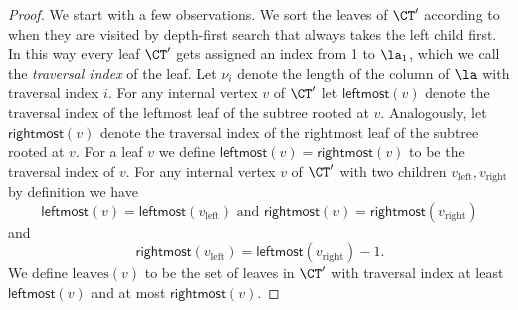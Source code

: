 \begin{proof}
We start with a few observations.
We sort the leaves of $\CT'$ according to when they are visited by depth-first search that always takes the left child first. In this way every leaf $\CT'$ gets assigned an index from 1 to $\la_1$, which we call the \emph{traversal index} of the leaf.
Let $\nu_i$ denote the length of the column of $\la$ with traversal index $i$.
For any internal vertex $v$ of $\CT'$ let $\textsf{leftmost}(v)$ denote the traversal index of the leftmost leaf of the subtree rooted at $v$.
Analogously, let $\textsf{rightmost}(v)$ denote the traversal index of the rightmost leaf of the subtree rooted at $v$. For a leaf $v$ we define $\textsf{leftmost}(v)=\textsf{rightmost}(v)$ to be the traversal index of $v$.
For any internal vertex $v$ of $\CT'$ with two children $v_\text{left}, v_\text{right}$ by definition we have
\begin{equation}\label{eq:leftmostv}
\textsf{leftmost}(v)=\textsf{leftmost}(v_\text{left}) \text{ and } \textsf{rightmost}(v)=\textsf{rightmost}(v_\text{right})
\end{equation}
and
\begin{equation}\label{eq:rightmostleft}
\textsf{rightmost}(v_\text{left})=\textsf{leftmost}(v_\text{right})-1.
\end{equation}
We define $\text{leaves}(v)$ to be the set of leaves in $\CT'$ with traversal index at least $\textsf{leftmost}(v)$ and at most $\textsf{rightmost}(v)$.


\end{proof}
